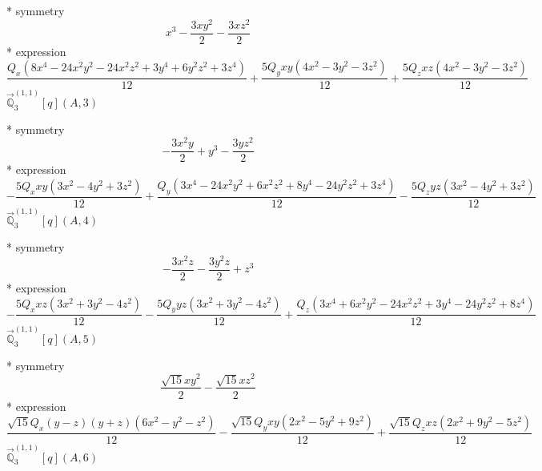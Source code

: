 \documentclass[fleqn,8pt]{jsarticle}
\begin{document}
\noindent\quad ** symmetry
\begin{dmath*}
x^{3} - \frac{3 x y^{2}}{2} - \frac{3 x z^{2}}{2}
\end{dmath*}
\noindent\quad ** expression
\begin{dmath*}
\frac{Q_{x} \left(8 x^{4} - 24 x^{2} y^{2} - 24 x^{2} z^{2} + 3 y^{4} + 6 y^{2} z^{2} + 3 z^{4}\right)}{12} + \frac{5 Q_{y} x y \left(4 x^{2} - 3 y^{2} - 3 z^{2}\right)}{12} + \frac{5 Q_{z} x z \left(4 x^{2} - 3 y^{2} - 3 z^{2}\right)}{12}
\end{dmath*}
\noindent\quad $\vec{\mathbb{Q}}_{3}^{(1,1)}[q](A,3)$

\noindent\quad ** symmetry
\begin{dmath*}
- \frac{3 x^{2} y}{2} + y^{3} - \frac{3 y z^{2}}{2}
\end{dmath*}
\noindent\quad ** expression
\begin{dmath*}
- \frac{5 Q_{x} x y \left(3 x^{2} - 4 y^{2} + 3 z^{2}\right)}{12} + \frac{Q_{y} \left(3 x^{4} - 24 x^{2} y^{2} + 6 x^{2} z^{2} + 8 y^{4} - 24 y^{2} z^{2} + 3 z^{4}\right)}{12} - \frac{5 Q_{z} y z \left(3 x^{2} - 4 y^{2} + 3 z^{2}\right)}{12}
\end{dmath*}
\noindent\quad $\vec{\mathbb{Q}}_{3}^{(1,1)}[q](A,4)$

\noindent\quad ** symmetry
\begin{dmath*}
- \frac{3 x^{2} z}{2} - \frac{3 y^{2} z}{2} + z^{3}
\end{dmath*}
\noindent\quad ** expression
\begin{dmath*}
- \frac{5 Q_{x} x z \left(3 x^{2} + 3 y^{2} - 4 z^{2}\right)}{12} - \frac{5 Q_{y} y z \left(3 x^{2} + 3 y^{2} - 4 z^{2}\right)}{12} + \frac{Q_{z} \left(3 x^{4} + 6 x^{2} y^{2} - 24 x^{2} z^{2} + 3 y^{4} - 24 y^{2} z^{2} + 8 z^{4}\right)}{12}
\end{dmath*}
\noindent\quad $\vec{\mathbb{Q}}_{3}^{(1,1)}[q](A,5)$

\noindent\quad ** symmetry
\begin{dmath*}
\frac{\sqrt{15} x y^{2}}{2} - \frac{\sqrt{15} x z^{2}}{2}
\end{dmath*}
\noindent\quad ** expression
\begin{dmath*}
\frac{\sqrt{15} Q_{x} \left(y - z\right) \left(y + z\right) \left(6 x^{2} - y^{2} - z^{2}\right)}{12} - \frac{\sqrt{15} Q_{y} x y \left(2 x^{2} - 5 y^{2} + 9 z^{2}\right)}{12} + \frac{\sqrt{15} Q_{z} x z \left(2 x^{2} + 9 y^{2} - 5 z^{2}\right)}{12}
\end{dmath*}
\noindent\quad $\vec{\mathbb{Q}}_{3}^{(1,1)}[q](A,6)$
\end{document}
